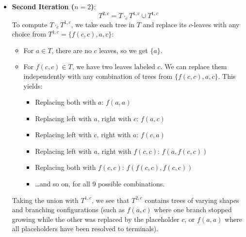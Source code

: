 \begin{example}
\begin{itemize}
    \item \textbf{Second Iteration ($n=2$)}:
    $$T^{2, c} = T \cdot_c T^{1, c} \cup T^{1, c}$$
    To compute $T \cdot_c T^{1, c}$, we take each tree in $T$ and replace its $c$-leaves with any choice from $T^{1, c} = \{ f(c, c), a, c \}$:
    \begin{itemize}
        \item For $a \in T$, there are no $c$ leaves, so we get $\{a\}$.
        \item For $f(c, c) \in T$, we have two leaves labeled $c$. We can replace them independently with any combination of trees from $\{ f(c, c), a, c \}$. This yields:
        \begin{itemize}
            \item Replacing both with $a$: $f(a, a)$
            \item Replacing left with $a$, right with $c$: $f(a, c)$
            \item Replacing left with $c$, right with $a$: $f(c, a)$
            \item Replacing left with $a$, right with $f(c, c)$: $f(a, f(c, c))$
            \item Replacing both with $f(c, c)$: $f(f(c, c), f(c, c))$
            \item \dots and so on, for all 9 possible combinations.
        \end{itemize}
    \end{itemize}
    Taking the union with $T^{1, c}$, we see that $T^{2, c}$ contains trees of varying shapes and branching configurations (such as $f(a, c)$ where one branch stopped growing while the other was replaced by the placeholder $c$, or $f(a, a)$ where all placeholders have been resolved to terminals).
\end{itemize}
\end{example}

